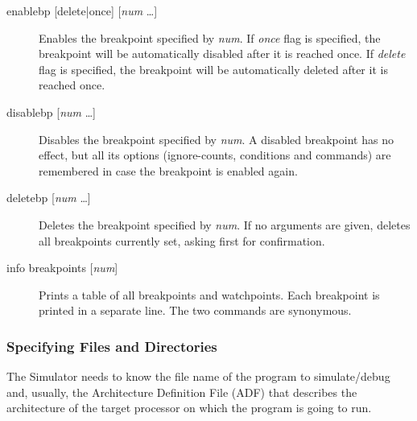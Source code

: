 \documentclass[a4paper,twoside]{tceusermanual}
\begin{document}
\begin{description}
\item[enablebp {[delete|once] [\emph{num} \ldots]}] %
  Enables the breakpoint specified by \emph{num}.  If \emph{once} flag is
  specified, the breakpoint will be automatically disabled after it is
  reached once.  If \emph{delete} flag is specified, the breakpoint will be
  automatically deleted after it is reached once.
\item[disablebp {[\emph{num} \ldots]}] %
  Disables the breakpoint specified by \emph{num}.  A disabled breakpoint
  has no effect, but all its options (ignore-counts, conditions and
  commands) are remembered in case the breakpoint is enabled again.
\item[deletebp {[\emph{num} \ldots]}] %
  Deletes the breakpoint specified by \emph{num}.  If no arguments are
  given, deletes all breakpoints currently set, asking first for
  confirmation.
\item[info breakpoints {[\emph{num}]}] %
  Prints a table of all breakpoints and watchpoints.  Each breakpoint is
  printed in a separate line.  The two commands are synonymous.
\end{description}

\subsubsection{Specifying Files and Directories}
\label{ssec:debug-files}

The Simulator needs to know the file name of the program to
simulate/debug and, usually, the Architecture Definition File (ADF)
that describes the architecture of the target processor on which the
program is going to run.  
\end{document}
